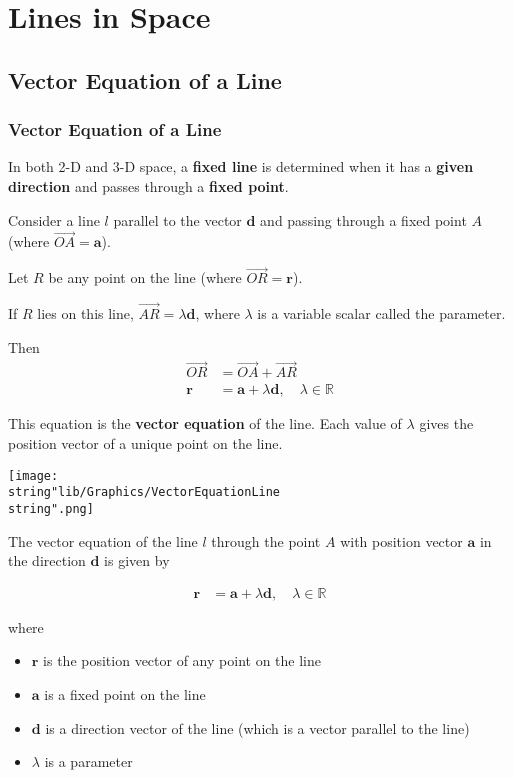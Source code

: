 \documentclass[11pt,a4paper]{book}
\newcommand{\R}{\mathbb{R}}
\begin{document}
\newpage


\chapter{Lines in Space}

\section{Vector Equation of a Line}

\subsection{Vector Equation of a Line}
In both 2-D and 3-D space, a \textbf{fixed line} is determined when
it has a \textbf{given direction} and passes through a\textbf{ fixed
point}.

Consider a line $l$ parallel to the vector $\textbf{d}$ and passing
through a fixed point $A$ (where $\overrightarrow{OA}=\textbf{a}$).

Let $R$ be any point on the line (where $\overrightarrow{OR}=\textbf{r}$).

If $R$ lies on this line, $\overrightarrow{AR}=\lambda\textbf{d}$,
where $\lambda$ is a variable scalar called the parameter.

Then
\begin{align*}
\overrightarrow{OR} & =\overrightarrow{OA}+\overrightarrow{AR}\\
\textbf{r} & =\textbf{a}+\lambda\textbf{d},\quad\lambda\in\R
\end{align*}

This equation is the \textbf{vector equation} of the line. Each value
of $\lambda$ gives the position vector of a unique point on the line.
\begin{center}
\texttt{[image: \\string"lib/Graphics/VectorEquationLine\\string".png]}
\par\end{center}

\begin{tcolorbox}[colback=blue!5, colframe=black, boxrule=.4pt, sharpish corners]

The vector equation of the line $l$ through the point $A$ with position
vector $\textbf{a}$ in the direction $\textbf{d}$ is given by

\begin{align*}
\textbf{r} & =\textbf{a}+\lambda\textbf{d},\quad\lambda\in\R
\end{align*}

where
\begin{itemize}
\item $\textbf{r}$ is the position vector of any point on the line
\item $\textbf{a}$ is a fixed point on the line
\item $\textbf{d}$ is a direction vector of the line (which is a vector
parallel to the line)
\item $\lambda$ is a parameter
\end{itemize}
\end{tcolorbox}
\end{document}
